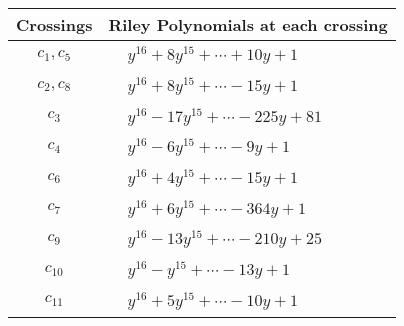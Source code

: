 \documentclass[1p]{elsarticle_modified}
\theoremstyle{definition}
\begin{document}
\begin{tabular}{m{50pt}|m{274pt}}
Crossings & \hspace{64pt}Riley Polynomials at each crossing \\
\hline $$\begin{aligned}c_{1},c_{5}\end{aligned}$$&$\begin{aligned}
&y^{16}+8 y^{15}+\cdots+10 y+1
\end{aligned}$\\
\hline $$\begin{aligned}c_{2},c_{8}\end{aligned}$$&$\begin{aligned}
&y^{16}+8 y^{15}+\cdots-15 y+1
\end{aligned}$\\
\hline $$\begin{aligned}c_{3}\end{aligned}$$&$\begin{aligned}
&y^{16}-17 y^{15}+\cdots-225 y+81
\end{aligned}$\\
\hline $$\begin{aligned}c_{4}\end{aligned}$$&$\begin{aligned}
&y^{16}-6 y^{15}+\cdots-9 y+1
\end{aligned}$\\
\hline $$\begin{aligned}c_{6}\end{aligned}$$&$\begin{aligned}
&y^{16}+4 y^{15}+\cdots-15 y+1
\end{aligned}$\\
\hline $$\begin{aligned}c_{7}\end{aligned}$$&$\begin{aligned}
&y^{16}+6 y^{15}+\cdots-364 y+1
\end{aligned}$\\
\hline $$\begin{aligned}c_{9}\end{aligned}$$&$\begin{aligned}
&y^{16}-13 y^{15}+\cdots-210 y+25
\end{aligned}$\\
\hline $$\begin{aligned}c_{10}\end{aligned}$$&$\begin{aligned}
&y^{16}- y^{15}+\cdots-13 y+1
\end{aligned}$\\
\hline $$\begin{aligned}c_{11}\end{aligned}$$&$\begin{aligned}
&y^{16}+5 y^{15}+\cdots-10 y+1
\end{aligned}$\\
\hline
\end{tabular}\\~\\
\end{document}
